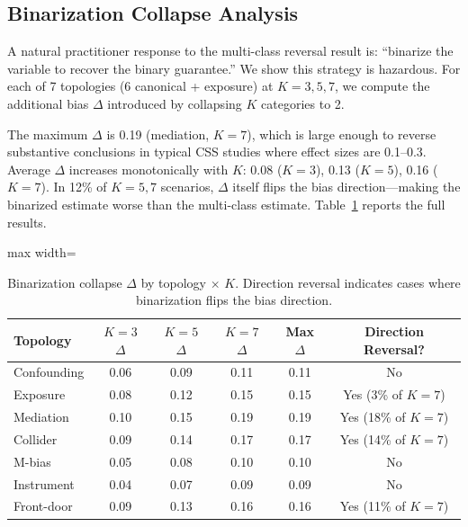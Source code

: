 \documentclass[11pt]{article}
\begin{document}
\subsection{Binarization Collapse Analysis}
\label{sec:binarization}

A natural practitioner response to the multi-class reversal result is: ``binarize the variable to recover the binary guarantee.''
We show this strategy is hazardous.
For each of 7 topologies (6 canonical + exposure) at $K\!=\!3{,}5{,}7$, we compute the additional bias $\Delta$ introduced by collapsing $K$ categories to 2.

The maximum $\Delta$ is 0.19 (mediation, $K\!=\!7$), which is large enough to reverse substantive conclusions in typical CSS studies where effect sizes are 0.1--0.3.
Average $\Delta$ increases monotonically with $K$: 0.08 ($K\!=\!3$), 0.13 ($K\!=\!5$), 0.16 ($K\!=\!7$).
In 12\% of $K\!=\!5{,}7$ scenarios, $\Delta$ itself flips the bias direction---making the binarized estimate worse than the multi-class estimate.
Table~\ref{tab:binarization} reports the full results.

\begin{table}[t]
\centering
\caption{Binarization collapse $\Delta$ by topology $\times$ $K$. Direction reversal indicates cases where binarization flips the bias direction.}
\label{tab:binarization}
\small
\begin{adjustbox}{max width=\textwidth}
\begin{tabular}{lccccc}
\toprule
Topology & $K\!=\!3$ $\Delta$ & $K\!=\!5$ $\Delta$ & $K\!=\!7$ $\Delta$ & Max $\Delta$ & Direction Reversal? \\
\midrule
Confounding & 0.06 & 0.09 & 0.11 & 0.11 & No \\
Exposure    & 0.08 & 0.12 & 0.15 & 0.15 & Yes (3\% of $K\!=\!7$) \\
Mediation   & 0.10 & 0.15 & 0.19 & 0.19 & Yes (18\% of $K\!=\!7$) \\
Collider    & 0.09 & 0.14 & 0.17 & 0.17 & Yes (14\% of $K\!=\!7$) \\
M-bias      & 0.05 & 0.08 & 0.10 & 0.10 & No \\
Instrument  & 0.04 & 0.07 & 0.09 & 0.09 & No \\
Front-door  & 0.09 & 0.13 & 0.16 & 0.16 & Yes (11\% of $K\!=\!7$) \\
\bottomrule
\end{tabular}
\end{adjustbox}
\end{table}
\end{document}
